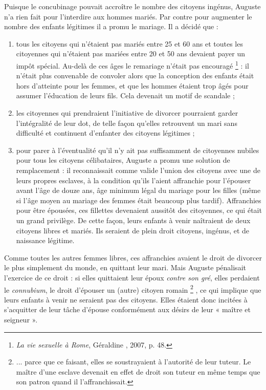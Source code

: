  Puisque le concubinage pouvait accroître le nombre des citoyens ingénus, Auguste n'a rien fait pour l'interdire aux hommes mariés. Par contre pour augmenter le nombre des enfants légitimes il a promu le mariage. Il a décidé que : 
\begin{enumerate}
\item tous les citoyens qui n'étaient pas mariés entre 25 et 60 ans et toutes les citoyennes qui n'étaient pas mariées entre 20 et 50 ans devaient payer un impôt spécial. Au-delà de ces âges le remariage n'était pas encouragé%
\footnote{\emph{La vie sexuelle à Rome}, Géraldine , 2007, p. 48.}
: il n'était plus convenable de convoler alors que la conception des enfants était hors d'atteinte pour les femmes, et que les hommes étaient trop âgés pour assumer l'éducation de leurs fils. Cela devenait un motif de scandale ;
\item les citoyennes qui prendraient l'initiative de divorcer pourraient garder l'intégralité de leur dot, de telle façon qu'elles retrouvent un mari sans difficulté et continuent d'enfanter des citoyens légitimes ;
\item pour parer à l'éventualité qu'il n'y ait pas suffisamment de citoyennes nubiles pour tous les citoyens célibataires, Auguste a promu une solution de remplacement : il reconnaissait comme valide l'union des citoyens avec une de leurs propres esclaves, à la condition qu'ils l'aient affranchie pour l'épouser avant l'âge de douze ans, âge minimum légal du mariage pour les filles (même si l'âge moyen au mariage des femmes était beaucoup plus tardif). Affranchies pour être épousées, ces fillettes devenaient aussitôt des citoyennes, ce qui était un grand privilège. De cette façon, leurs enfants à venir naîtraient de deux citoyens libres et mariés. Ils seraient de plein droit citoyens, ingénus, et de naissance légitime. 
\end{enumerate}

 Comme toutes les autres femmes libres, ces affranchies avaient le droit de divorcer le plus simplement du monde, en quittant leur mari. Mais Auguste pénalisait l'exercice de ce droit : si elles quittaient leur époux \emph{contre son gré}, elles perdaient le \emph{connubium}, le droit d'épouser un (autre) citoyen romain%
\footnote{... parce que ce faisant, elles se soustrayaient à l'autorité de leur tuteur. Le maître d'une esclave devenait en effet de droit son tuteur en même temps que son patron quand il l'affranchissait.}%
, ce qui implique que leurs enfants à venir ne seraient pas des citoyens. Elles étaient donc incitées à s'acquitter de leur tâche d'épouse conformément aux désirs de leur « maître et seigneur ».

